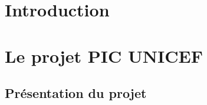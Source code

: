 \documentclass[asi]{picInsa}
\begin{document}
\couverture{}

\informationsGenerales{}
%
\begin{pagesService}
	\begin{historique}

	\end{historique}


        \begin{signatures}
        \end{signatures}
\end{pagesService}

\tableofcontents

\setcounter{chapter}{0}

\chapter{Introduction}
\label{Introduction}


\chapter{Le projet PIC UNICEF}
\label{le_projet}
\section{Présentation du projet}
\end{document}
